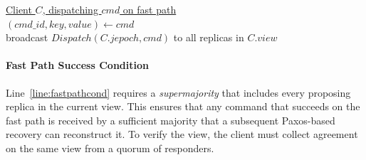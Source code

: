 \documentclass[twocolumn]{article}
\begin{document}

\begin{algorithm}
\caption{Client -- Dispatch (fast path)}
\label{alg:client_dispatch}
\setcounter{AlgoLine}{0}

\underline{Client $C$, dispatching $cmd$ on fast path}\\
$(cmd\_id, key, value) \gets cmd$\\
broadcast $Dispatch(C.jepoch, cmd)$ to all replicas in $C.view$\\
\end{algorithm}

\paragraph{Fast Path Success Condition}
Line~\ref{line:fastpathcond} requires a \emph{supermajority} that includes every proposing replica in the current view. This ensures that any command that succeeds on the fast path is received by a sufficient majority that a subsequent Paxos-based recovery can reconstruct it. To verify the view, the client must collect agreement on the same view from a quorum of responders.
\end{document}
